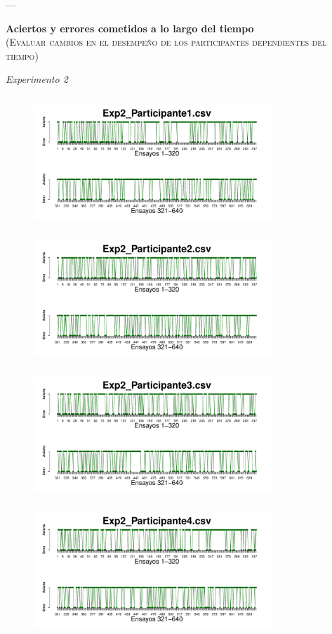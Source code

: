 \documentclass[a4paper ]{article}
\begin{document}
---
\vspace{3mm}
\begin{center}
{\LARGE \textbf{Aciertos y errores cometidos a lo largo del tiempo}}\\
{\small \textsc{(Evaluar cambios en el desempeño de los participantes dependientes del tiempo)}}\\
\smallskip
\end{center}
\begin{center}
{\LARGE \textit{Experimento 2}}\\
\end{center}
\vspace{3mm}
\begin{figure}[th]
\centering
\includegraphics[width=9cm, height=5cm]{Figures/Success_Exp2_P1} \includegraphics[width=9cm, height=5cm]{Figures/Success_Exp2_P2} 
\includegraphics[width=9cm, height=5cm]{Figures/Success_Exp2_P3} \includegraphics[width=9cm, height=5cm]{Figures/Success_Exp2_P4} 

\end{figure}
\end{document}
